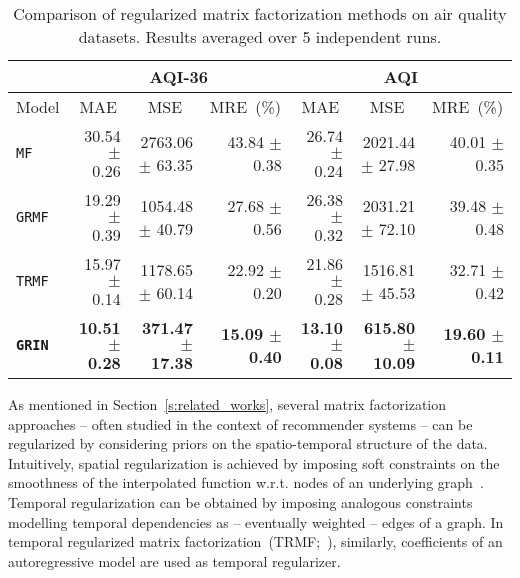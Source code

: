 \documentclass{article} \usepackage{iclr2022_conference,times}
\newcommand{\GRIL}{\texttt{GRIN}}
\begin{document}
\begin{table}[h]
\vspace{-0.2cm}
\caption{Comparison of regularized matrix factorization methods on air quality datasets. Results averaged over 5 independent runs.}
\vspace{0.1cm}
\centering
\begin{adjustbox}{max width=\textwidth}
\begin{tabular}{ l | r  r  r | r  r r }
\toprule
 \multicolumn{1}{c}{} &\multicolumn{3}{c}{AQI-36} & \multicolumn{3}{c}{AQI} \\
\toprule
 \multicolumn{1}{c}{Model}&\multicolumn{1}{|c}{\small MAE} & \multicolumn{1}{c}{\small MSE}  & \multicolumn{1}{c}{\small MRE~(\%)} & \multicolumn{1}{|c}{\small MAE} & \multicolumn{1}{c}{\small MSE} & \multicolumn{1}{c}{\small MRE~(\%)}\\
\midrule
\texttt{MF} & 30.54 {\tiny $\pm$ 0.26} & 2763.06 {\tiny $\pm$ 63.35} & 43.84 {\tiny $\pm$ 0.38} & 26.74 {\tiny $\pm$ 0.24} & 2021.44 {\tiny $\pm$ 27.98} & 40.01 {\tiny $\pm$ 0.35}\\
\texttt{GRMF} & 19.29 {\tiny $\pm$ 0.39} & 1054.48 {\tiny $\pm$ 40.79} & 27.68 {\tiny $\pm$ 0.56} & 26.38 {\tiny $\pm$ 0.32} & 2031.21 {\tiny $\pm$ 72.10} & 39.48 {\tiny $\pm$ 0.48}\\
\texttt{TRMF} & 15.97 {\tiny $\pm$ 0.14} & 1178.65 {\tiny $\pm$ 60.14} & 22.92 {\tiny $\pm$ 0.20} & 21.86 {\tiny $\pm$ 0.28} & 1516.81 {\tiny $\pm$ 45.53} & 32.71 {\tiny $\pm$ 0.42}\\
\midrule[0.3pt]
\texttt{\textbf{\GRIL}} & \textbf{10.51 {\tiny $\pm$ 0.28}} & \textbf{371.47 {\tiny $\pm$ 17.38}} & \textbf{15.09 {\tiny $\pm$ 0.40}} & \textbf{13.10 {\tiny $\pm$ 0.08}} & \textbf{615.80 {\tiny $\pm$ 10.09}} & \textbf{19.60 {\tiny $\pm$ 0.11}}\\
\bottomrule
\end{tabular}
\end{adjustbox}
\label{t:grmf}
\end{table} 
As mentioned in Section~\ref{s:related_works}, several matrix factorization approaches -- often studied in the context of recommender systems -- can be regularized by considering priors on the spatio-temporal structure of the data. Intuitively, spatial regularization is achieved by imposing soft constraints on the smoothness of the interpolated function w.r.t. nodes of an underlying graph~\citep{cai2010graph, rao2015collaborative}. Temporal regularization can be obtained by imposing analogous constraints modelling temporal dependencies as -- eventually weighted -- edges of a graph. In temporal regularized matrix factorization~(TRMF;~\citealp{yu2016temporal}), similarly, coefficients of an autoregressive model are used as temporal regularizer. 
\end{document}
